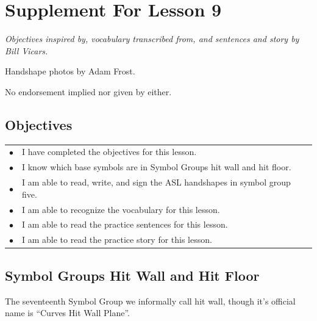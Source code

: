 \documentclass{article}
\begin{document}
\newfontfamily{}
\newfontfamily{}
\newcommand{\bul}{\hfil$\bullet$&}
\renewenvironment{glossary}{\begin{multicols}{5}\begin{center}}{\end{center}\end{multicols}}
\setcounter{secnumdepth}{0}
\setlength{\columnseprule}{1pt}

\section{Supplement For Lesson 9}

\begin{center}
\it
Objectives inspired by, vocabulary transcribed from, and sentences and story by Bill Vicars.

Handshape photos by Adam Frost.

No endorsement implied nor given by either.
\end{center}

\subsection{Objectives}

\begin{tabular}{p{1cm}p{14cm}}
\bul I have completed the objectives for this lesson.\\
\bul I know which base symbols are in Symbol Groups hit wall and hit floor.\\
\bul I am able to read, write, and sign the ASL handshapes in symbol group five.\\
\bul I am able to recognize the vocabulary for this lesson.\\
\bul I am able to read the practice sentences for this lesson.\\
\bul I am able to read the practice story for this lesson.\\
\end{tabular}

\subsection{Symbol Groups Hit Wall and Hit Floor}

The seventeenth Symbol Group we informally call hit wall, though it's official name is ``Curves Hit Wall Plane''.
\end{document}
